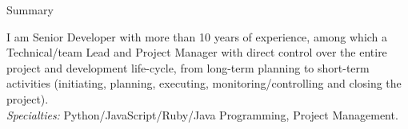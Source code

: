 \documentclass[]{mcdowellcv}
\begin{document}
    \makeheader
    \label{Contact}

    \begin{cvsection}{Summary}
        \label{Summary}
        \begin{cvsubsection}{}{}{}
            I am Senior Developer with more than 10 years of experience, among which a Technical/team Lead and Project Manager with direct control over the entire project and development life-cycle, from long-term planning to short-term activities (initiating, planning, executing, monitoring/controlling and closing the project).\\
            \textit{Specialties:} Python/JavaScript/Ruby/Java Programming, Project Management.
        \end{cvsubsection}
    \end{cvsection}
\end{document}
